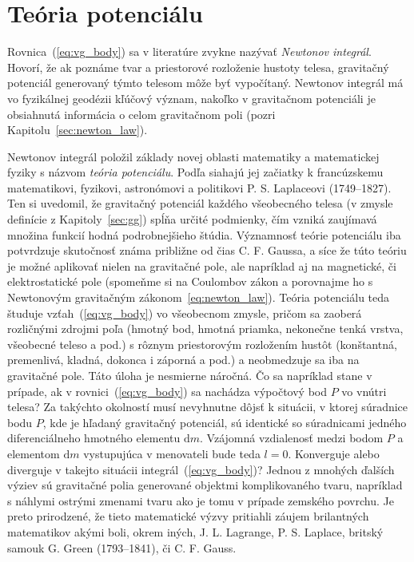 \documentclass[a4paper, 12pt]{book}
\newcommand{\diff}{\mathrm d}
\begin{document}
\section{Teória potenciálu}
\label{sec:potential_theory}

Rovnica~(\ref{eq:vg_body}) sa v literatúre zvykne nazývať \emph{Newtonov 
integrál}.  Hovorí, že ak poznáme tvar a priestorové rozloženie hustoty telesa, 
gravitačný potenciál generovaný týmto telesom môže byť vypočítaný.  Newtonov 
integrál má vo fyzikálnej geodézii kľúčový význam, nakoľko v gravitačnom 
potenciáli je obsiahnutá informácia o celom gravitačnom poli (pozri 
Kapitolu~\ref{sec:newton_law}).

Newtonov integrál položil základy novej oblasti matematiky a matematickej 
fyziky s názvom \emph{teória potenciálu}.  Podľa \cite{MacMillan1930} siahajú 
jej začiatky k francúzskemu matematikovi, fyzikovi, astronómovi a politikovi 
P. S. Laplaceovi (1749--1827).  Ten si uvedomil, že gravitačný potenciál 
každého všeobecného telesa (v zmysle definície z Kapitoly~\ref{sec:gg}) spĺňa 
určité podmienky, čím vzniká zaujímavá množina funkcií hodná podrobnejšieho 
štúdia.  Významnosť teórie potenciálu iba potvrdzuje skutočnosť známa približne 
od čias C. F. Gaussa, a síce že túto teóriu je možné aplikovať nielen na 
gravitačné pole, ale  napríklad aj na magnetické, či elektrostatické pole 
(spomeňme si na Coulombov zákon a porovnajme ho s Newtonovým gravitačným 
zákonom~\ref{eq:newton_law}).  Teória potenciálu teda študuje 
vzťah~(\ref{eq:vg_body}) vo všeobecnom zmysle, pričom sa zaoberá rozličnými 
zdrojmi poľa (hmotný bod, hmotná priamka, nekonečne tenká vrstva, všeobecné 
teleso a pod.) s rôznym priestorovým rozložením hustôt (konštantná, premenlivá, 
kladná, dokonca i záporná a pod.) a neobmedzuje sa iba na gravitačné pole.  
Táto úloha je nesmierne náročná.  Čo sa napríklad stane v prípade, ak 
v rovnici~(\ref{eq:vg_body}) sa nachádza výpočtový bod $P$ vo vnútri telesa?  
Za takýchto okolností musí nevyhnutne dôjsť k situácii, v ktorej súradnice bodu 
$P$, kde je hľadaný gravitačný potenciál, sú identické so súradnicami jedného 
diferenciálneho hmotného elementu $\diff m$.  Vzájomná vzdialenosť medzi bodom 
$P$ a elementom $\diff m$ vystupujúca v menovateli bude teda $l = 0$.  
Konverguje alebo diverguje v takejto situácii integrál~(\ref{eq:vg_body})?  
Jednou z mnohých ďalších výziev sú gravitačné polia generované objektmi 
komplikovaného tvaru, napríklad s náhlymi ostrými zmenami tvaru ako je tomu 
v prípade zemského povrchu.  Je preto prirodzené, že tieto matematické výzvy 
pritiahli záujem brilantných matematikov akými boli, okrem iných, 
J. L. Lagrange, P. S. Laplace, britský samouk G. Green (1793--1841), či 
C. F. Gauss.
\end{document}
